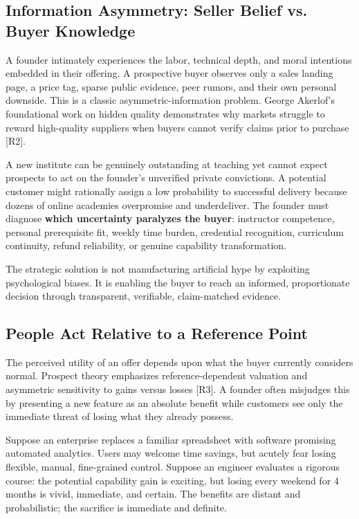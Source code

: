 \subsection{Information Asymmetry: Seller Belief vs. Buyer Knowledge}

A founder intimately experiences the labor, technical depth, and moral intentions embedded in their offering. A prospective buyer observes only a sales landing page, a price tag, sparse public evidence, peer rumors, and their own personal downside. This is a classic asymmetric-information problem. George Akerlof's foundational work on hidden quality demonstrates why markets struggle to reward high-quality suppliers when buyers cannot verify claims prior to purchase [R2].

A new institute can be genuinely outstanding at teaching yet cannot expect prospects to act on the founder's unverified private convictions. A potential customer might rationally assign a low probability to successful delivery because dozens of online academies overpromise and underdeliver. The founder must diagnose \textbf{which uncertainty paralyzes the buyer}: instructor competence, personal prerequisite fit, weekly time burden, credential recognition, curriculum continuity, refund reliability, or genuine capability transformation.

The strategic solution is not manufacturing artificial hype by exploiting psychological biases. It is enabling the buyer to reach an informed, proportionate decision through transparent, verifiable, claim-matched evidence.

\subsection{People Act Relative to a Reference Point}

The perceived utility of an offer depends upon what the buyer currently considers normal. Prospect theory emphasizes reference-dependent valuation and asymmetric sensitivity to gains versus losses [R3]. A founder often misjudges this by presenting a new feature as an absolute benefit while customers see only the immediate threat of losing what they already possess.

Suppose an enterprise replaces a familiar spreadsheet with software promising automated analytics. Users may welcome time savings, but acutely fear losing flexible, manual, fine-grained control. Suppose an engineer evaluates a rigorous course: the potential capability gain is exciting, but losing every weekend for 4 months is vivid, immediate, and certain. The benefits are distant and probabilistic; the sacrifice is immediate and definite.

